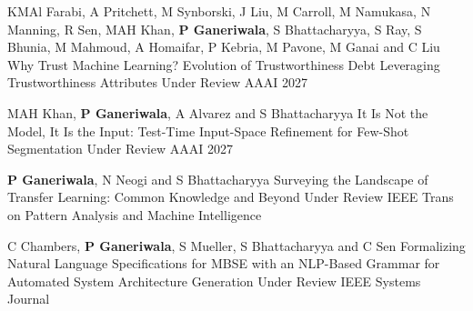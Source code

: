 


\begin{cventries}
\cventry
{KMAl Farabi, A Pritchett, M Synborski, J Liu, M Carroll, M Namukasa, N Manning, R Sen, MAH Khan, \textbf{P Ganeriwala}, S Bhattacharyya, S Ray, S Bhunia, M Mahmoud, A Homaifar, P Kebria, M Pavone, M Ganai and C Liu}
{
Why Trust Machine Learning? Evolution of Trustworthiness Debt Leveraging Trustworthiness Attributes}
{Under Review}
{AAAI 2027} 
{ %
\begin{cvitems}
\end{cvitems}
}
\cventry
{MAH Khan, \textbf{P Ganeriwala}, A Alvarez and S Bhattacharyya}
{
It Is Not the Model, It Is the Input: Test-Time Input-Space Refinement for Few-Shot Segmentation}
{Under Review}
{AAAI 2027} 
{ %
\begin{cvitems}
\end{cvitems}
}
\cventry
{\textbf{P Ganeriwala}, N Neogi and S Bhattacharyya}
{Surveying the Landscape of Transfer Learning: Common Knowledge and Beyond}
{Under Review}
{IEEE Trans on Pattern Analysis and Machine Intelligence} 
{ %
\begin{cvitems}
\end{cvitems}
}
\cventry
{C Chambers, \textbf{P Ganeriwala}, S Mueller, S Bhattacharyya and C Sen}
{Formalizing Natural Language Specifications for MBSE with an NLP-Based Grammar for Automated System Architecture Generation}
{Under Review}
{IEEE Systems Journal} 

\end{cventries}
